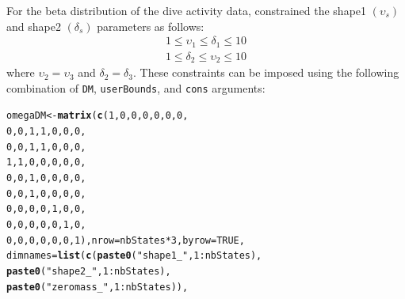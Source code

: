 \documentclass[12pt]{article}\usepackage[]{graphicx}\usepackage[]{color}
\makeatletter
\newcommand{\hlnum}[1]{\textcolor[rgb]{0.686,0.059,0.569}{#1}}%
\newcommand{\hlstr}[1]{\textcolor[rgb]{0.192,0.494,0.8}{#1}}%
\newcommand{\hlopt}[1]{\textcolor[rgb]{0,0,0}{#1}}%
\newcommand{\hlstd}[1]{\textcolor[rgb]{0.345,0.345,0.345}{#1}}%
\newcommand{\hlkwb}[1]{\textcolor[rgb]{0.69,0.353,0.396}{#1}}%
\newcommand{\hlkwc}[1]{\textcolor[rgb]{0.333,0.667,0.333}{#1}}%
\newcommand{\hlkwd}[1]{\textcolor[rgb]{0.737,0.353,0.396}{\textbf{#1}}}%
\newenvironment{kframe}{%
 \def\at@end@of@kframe{}%
 \ifinner\ifhmode%
  \def\at@end@of@kframe{\end{minipage}}%
  \begin{minipage}{\columnwidth}%
 \fi\fi%
 \def\FrameCommand##1{\hskip\@totalleftmargin \hskip-\fboxsep
 \colorbox{shadecolor}{##1}\hskip-\fboxsep
     \hskip-\linewidth \hskip-\@totalleftmargin \hskip\columnwidth}%
 \MakeFramed {\advance\hsize-\width
   \@totalleftmargin\z@ \linewidth\hsize
   \@setminipage}}%
 {\par\unskip\endMakeFramed%
 \at@end@of@kframe}
\newenvironment{knitrout}{}{} %
\makeatother
\begin{document}
For the beta distribution of the dive activity data, \cite{McClintockEtAl2013c} constrained the shape1 $(\upsilon_s)$ and shape2 $(\delta_s)$ parameters as follows:
\begin{eqnarray*}
1 \le \upsilon_1 \le \delta_1 \le 10 \\
1 \le \delta_2 \le \upsilon_2 \le 10
\end{eqnarray*}
where $\upsilon_2=\upsilon_3$ and $\delta_2=\delta_3$. These constraints can be imposed using the following combination of \verb|DM|, \verb|userBounds|, and \verb|cons| arguments:
\begin{knitrout}
\color{fgcolor}\begin{kframe}
\begin{alltt}
\hlstd{omegaDM} \hlkwb{<-} \hlkwd{matrix}\hlstd{(}\hlkwd{c}\hlstd{(}\hlnum{1}\hlstd{,}\hlnum{0}\hlstd{,}\hlnum{0}\hlstd{,}\hlnum{0}\hlstd{,}\hlnum{0}\hlstd{,}\hlnum{0}\hlstd{,}\hlnum{0}\hlstd{,}
                    \hlnum{0}\hlstd{,}\hlnum{0}\hlstd{,}\hlnum{1}\hlstd{,}\hlnum{1}\hlstd{,}\hlnum{0}\hlstd{,}\hlnum{0}\hlstd{,}\hlnum{0}\hlstd{,}
                    \hlnum{0}\hlstd{,}\hlnum{0}\hlstd{,}\hlnum{1}\hlstd{,}\hlnum{1}\hlstd{,}\hlnum{0}\hlstd{,}\hlnum{0}\hlstd{,}\hlnum{0}\hlstd{,}
                    \hlnum{1}\hlstd{,}\hlnum{1}\hlstd{,}\hlnum{0}\hlstd{,}\hlnum{0}\hlstd{,}\hlnum{0}\hlstd{,}\hlnum{0}\hlstd{,}\hlnum{0}\hlstd{,}
                    \hlnum{0}\hlstd{,}\hlnum{0}\hlstd{,}\hlnum{1}\hlstd{,}\hlnum{0}\hlstd{,}\hlnum{0}\hlstd{,}\hlnum{0}\hlstd{,}\hlnum{0}\hlstd{,}
                    \hlnum{0}\hlstd{,}\hlnum{0}\hlstd{,}\hlnum{1}\hlstd{,}\hlnum{0}\hlstd{,}\hlnum{0}\hlstd{,}\hlnum{0}\hlstd{,}\hlnum{0}\hlstd{,}
                    \hlnum{0}\hlstd{,}\hlnum{0}\hlstd{,}\hlnum{0}\hlstd{,}\hlnum{0}\hlstd{,}\hlnum{1}\hlstd{,}\hlnum{0}\hlstd{,}\hlnum{0}\hlstd{,}
                    \hlnum{0}\hlstd{,}\hlnum{0}\hlstd{,}\hlnum{0}\hlstd{,}\hlnum{0}\hlstd{,}\hlnum{0}\hlstd{,}\hlnum{1}\hlstd{,}\hlnum{0}\hlstd{,}
                    \hlnum{0}\hlstd{,}\hlnum{0}\hlstd{,}\hlnum{0}\hlstd{,}\hlnum{0}\hlstd{,}\hlnum{0}\hlstd{,}\hlnum{0}\hlstd{,}\hlnum{1}\hlstd{),}\hlkwc{nrow}\hlstd{=nbStates}\hlopt{*}\hlnum{3}\hlstd{,}\hlkwc{byrow}\hlstd{=}\hlnum{TRUE}\hlstd{,}
                \hlkwc{dimnames}\hlstd{=}\hlkwd{list}\hlstd{(}\hlkwd{c}\hlstd{(}\hlkwd{paste0}\hlstd{(}\hlstr{"shape1_"}\hlstd{,}\hlnum{1}\hlopt{:}\hlstd{nbStates),}
                                \hlkwd{paste0}\hlstd{(}\hlstr{"shape2_"}\hlstd{,}\hlnum{1}\hlopt{:}\hlstd{nbStates),}
                                \hlkwd{paste0}\hlstd{(}\hlstr{"zeromass_"}\hlstd{,}\hlnum{1}\hlopt{:}\hlstd{nbStates)),}

\end{alltt}
\end{kframe}
\end{knitrout}
\end{document}
